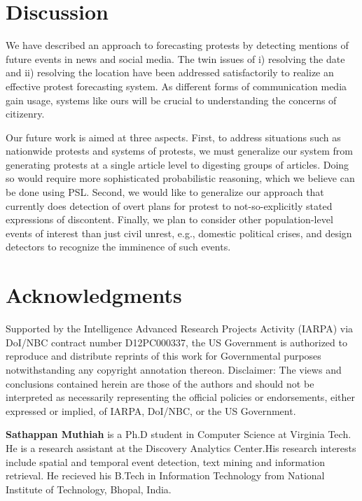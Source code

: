 \documentclass[letterpaper]{article}
\begin{document}
\section{Discussion}
We have described an approach to forecasting protests by detecting
mentions of future events in news and social media. The twin issues
of i) resolving the date and ii) resolving the location have been
addressed satisfactorily to realize an effective protest forecasting
system. As different forms of communication media gain usage, systems
like ours will be crucial to understanding the concerns of citizenry.

Our future work is aimed at three aspects. First, to address situations
such as nationwide protests and systems of protests, we must generalize
our system from generating protests at a single article level to
digesting groups of articles. Doing so would require more sophisticated
probabilistic reasoning, which we believe can be done using PSL.
Second, we would like to generalize our
approach that currently does detection of overt plans for protest to
not-so-explicitly stated expressions of discontent.  Finally, we plan to
consider other population-level events of interest than just civil
unrest, e.g., domestic political crises, and design detectors to
recognize the imminence of such events.

\section*{Acknowledgments}
Supported by the Intelligence Advanced Research Projects Activity (IARPA) via
DoI/NBC contract number D12PC000337, the US Government is authorized to
reproduce and distribute reprints of this work for Governmental purposes
notwithstanding any copyright annotation thereon.  Disclaimer: The views and
conclusions contained herein are those of the authors and should not be
interpreted as necessarily representing the official policies or endorsements,
either expressed or implied, of IARPA, DoI/NBC, or the US Government.




\par
{\bf Sathappan Muthiah} is a Ph.D student in Computer Science at
Virginia Tech. He is a research assistant at the Discovery Analytics
Center.His research interests include spatial and temporal event
detection, text mining and information retrieval. He recieved his B.Tech
in Information Technology from National Institute of Technology, Bhopal,
India.
\par
\end{document}
